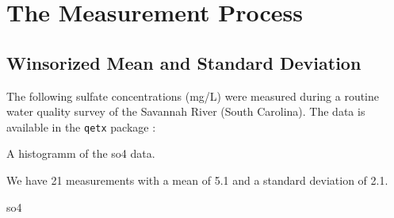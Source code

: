 \chapter{The Measurement Process}
\section{Winsorized Mean and Standard Deviation}

The following sulfate concentrations (mg/L) were measured during a routine 
water quality survey of the Savannah River (South Carolina). 
The data is available in the \verb|qetx| package :

\begin{knitrout}
\color{fgcolor}\begin{kframe}
\begin{alltt}
\end{alltt}


{\ttfamily\noindent\color{warningcolor}{\#\# Warning: data set 'so4' not found}}\end{kframe}
\end{knitrout}


\begin{marginfigure}
\begin{knitrout}
\color{fgcolor}\begin{kframe}


{\ttfamily\noindent\bfseries\color{errorcolor}{\#\# Error: object 'so4' not found}}\end{kframe}
\end{knitrout}

\caption{A histogramm of the so4 data.}
\end{marginfigure}


\begin{knitrout}
\color{fgcolor}\begin{kframe}
\begin{alltt}
\end{alltt}


{\ttfamily\noindent\bfseries\color{errorcolor}{\#\# Error: object 'so4' not found}}\begin{alltt}
\end{alltt}


{\ttfamily\noindent\bfseries\color{errorcolor}{\#\# Error: object 'so4' not found}}\begin{alltt}
\end{alltt}


{\ttfamily\noindent\bfseries\color{errorcolor}{\#\# Error: object 'so4' not found}}\begin{alltt}
\end{alltt}


{\ttfamily\noindent\bfseries\color{errorcolor}{\#\# Error: object 'so4' not found}}\end{kframe}
\end{knitrout}


We have 21 measurements with a mean of 5.1 and a standard deviation of 2.1.

so4

